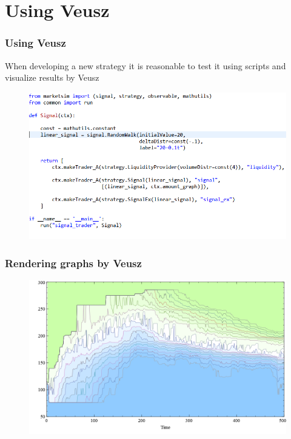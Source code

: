 \documentclass{beamer}
\begin{document}
\section{Using Veusz}
\begin{frame}
\frametitle{Using Veusz}
When developing a new strategy it is reasonable to test it using scripts and visualize results by Veusz
\begin{figure}[htbp]
\centering
\includegraphics[width=1\linewidth]{using_veusz_code.png}
\end{figure}
\end{frame}

\begin{frame}
\frametitle{Rendering graphs by Veusz}
\begin{figure}[htbp]
\centering
\includegraphics[width=1\linewidth]{veusz_graph.png}
\end{figure}
\end{frame}

\end{document}
